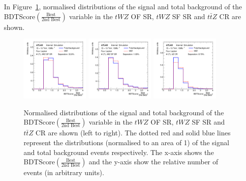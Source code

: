 In Figure~\ref{fig:bdtscore-bestover2ndbest}, normalised distributions of the signal and total background of the BDTScore$(\frac{\text{Best}}{\text{2nd Best}})$ variable in the $tWZ$ OF SR, $tWZ$ SF SR and $t\bar{t}Z$ CR are shown.
\begin{figure}
    \centering
    \includegraphics[width=0.3\textwidth]{figures/bdtPlots/lep4_tWZ_4T_OF_bdtScorebest.png}
    \includegraphics[width=0.3\textwidth]{figures/bdtPlots/lep4_tWZ_4T_SF_bdtScorebest.png}
    \includegraphics[width=0.3\textwidth]{figures/bdtPlots/lep4_ttZ_4T_bdtScorebest.png}
    \caption{Normalised distributions of the signal and total background of the BDTScore$(\frac{\text{Best}}{\text{2nd Best}})$ variable in the $tWZ$ OF SR, $tWZ$ SF SR and $t\bar{t}Z$ CR are shown (left to right). The dotted red and solid blue lines represent the distributions (normalised to an area of 1) of the signal and total background events respectively. The x-axis shows the BDTScore$(\frac{\text{Best}}{\text{2nd Best}})$ and the y-axis show the relative number of events (in arbitrary units).}
    \label{fig:bdtscore-bestover2ndbest}
\end{figure}


